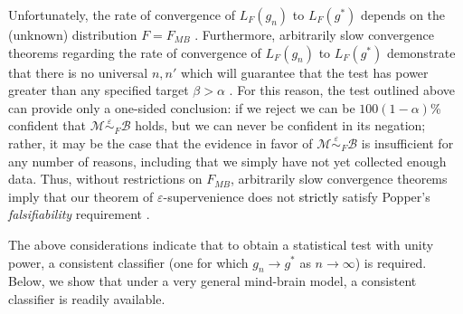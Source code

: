\documentclass{article}
\newcommand{\conv}{\rightarrow}
\newcommand{\mB}{\mathcal{B}}
\newcommand{\mM}{\mathcal{M}}
\newcommand{\MeB}{\mM \overset{\varepsilon}{{\sim}}_{F} \mB}
\providecommand{\tr}[1]{\textcolor{black}{#1}}
\begin{document}



Unfortunately, the rate of convergence of $L_{F}(g_n)$ to $L_{F}(g^*)$ depends on the (unknown) distribution $F=F_{MB}$ \cite{DGL96}. Furthermore, arbitrarily slow convergence theorems regarding the rate of convergence of $L_{F}(g_n)$ to $L_{F}(g^*)$ demonstrate that there is no universal $n,n'$ which will guarantee that the test has power greater than any specified target $\beta > \alpha$ \cite{Devroye83}. For this reason, the test outlined above can provide only a one-sided conclusion: if we reject we can be $100(1-\alpha)$\% confident that $\MeB$ holds, but we can never be confident in its negation; rather, it may be the case that the evidence in favor of $\MeB$ is insufficient for any number of reasons, including that we simply have not yet collected enough data. Thus, without restrictions on $F_{MB}$, arbitrarily slow convergence theorems imply that our theorem of $\varepsilon$-supervenience does not \tr{strictly} satisfy Popper's {\it falsifiability} requirement \cite{Popper}.

The above considerations indicate that to obtain a statistical test with unity power, a consistent classifier (one for which $g_n \conv g^*$ as $n \conv \infty$) is required. Below, we show that under a very general mind-brain model, a consistent classifier is readily available.


\end{document}
